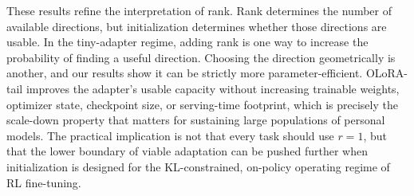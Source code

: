   These results refine the interpretation of rank.
  Rank determines the number of available directions, but initialization determines whether
  those directions are usable.
  In the tiny-adapter regime, adding rank is one way to increase the probability of finding
  a useful direction. Choosing the direction geometrically is another, and our results show
  it can be strictly more parameter-efficient.
  OLoRA-tail improves the adapter's usable capacity without increasing trainable weights,
  optimizer state, checkpoint size, or serving-time footprint, which is precisely the
  scale-down property that matters for sustaining large populations of personal models.
  The practical implication is not that every task should use $r{=}1$, but that the lower
  boundary of viable adaptation can be pushed further when initialization is designed for
  the KL-constrained, on-policy operating regime of RL fine-tuning.





